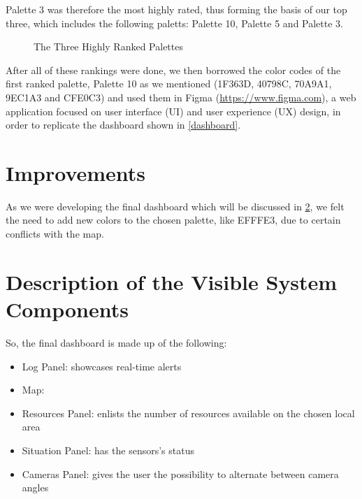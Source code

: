 Palette 3 was therefore the most highly rated, thus 
forming the basis of our top three, which includes the 
following paletts: Palette 10, Palette 5 and Palette 3.
\begin{figure}[H]
    \centerline{%
    \hfill
    \hfill
    }
    \caption{The Three Highly Ranked Palettes}
\end{figure} 
After all of these rankings were done, we then borrowed the 
color codes of the first ranked palette, Palette 10 as we mentioned 
(1F363D, 40798C, 70A9A1, 9EC1A3 and CFE0C3) and used them 
in Figma (\url{https://www.figma.com}), a web application focused on user interface 
(UI) and user experience (UX) design, in order to replicate 
the dashboard shown in \ref{dashboard}.
\section{Improvements}
As we were developing the final dashboard which will be 
discussed in \ref{description}, we felt the need to add 
new colors to the chosen palette, like EFFFE3, 
due to certain conflicts with the map.
\section{Description of the Visible System Components} \label{description}
So, the final dashboard is made up of the following: 
\begin{itemize}
    \item Log Panel: showcases real-time alerts
    \item Map: 
    \item Resources Panel: enlists the number of resources 
    available on the chosen local area
    \item Situation Panel: has the sensors's status
    \item Cameras Panel: gives the user the possibility 
    to alternate between camera angles
\end{itemize}